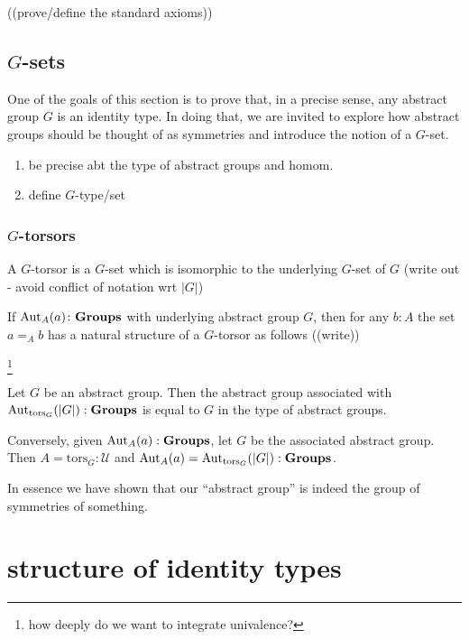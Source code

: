 \begin{definition}\label{def:grouphomomaxioms}
  ((prove/define the standard axioms))
\end{definition}




\subsection{$G$-sets}
\label{sec:gsets}
One of the goals of this section is to prove that, in a precise sense, any abstract group $G$ is an identity type.  In doing that, we are invited to explore how abstract groups should be thought of as symmetries and introduce the notion of a $G$-set.

\begin{enumerate}
\item be precise abt the type of abstract groups and homom.
\item define $G$-type/set
\end{enumerate}
\subsubsection{$G$-torsors}
\label{sec:Gtorsors}
\newcommand{\Gtorsor}{\mathrm{tors}_G}
\begin{definition}
  A $G$-torsor is a $G$-set which is isomorphic to the underlying $G$-set of $G$ (write out - avoid conflict of notation wrt $|G|$)
\end{definition}
\begin{example}
  If $\mathrm{Aut}_A(a)\colon\mathbf{Groups}$ with underlying abstract group $G$, then for any $b:A$ the set $a=_Ab$ has a natural structure of a $G$-torsor as follows ((write))
\end{example}

\footnote{how deeply do we want to integrate univalence?}
\begin{lemma}
  \label{lem:Groupsareidentitytypes}Let $G$ be an abstract group.  Then the abstract group associated with $\aut_{\Gtorsor}(|G|):\typegroup$ is equal to $G$ in the type of abstract groups.

Conversely, given $\mathrm{Aut}_A(a):\mathbf{Groups}$, let $G$ be the associated abstract group.  Then $A=\Gtorsor:\mathcal U$ and $\aut_A(a)=\aut_{\Gtorsor}(|G|):\typegroup$.
\end{lemma}
In essence we have shown that our ``abstract group'' is indeed the group of symmetries of something.

\section{structure of identity types}

